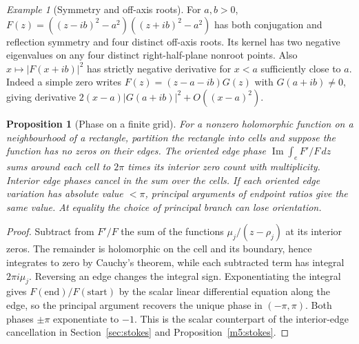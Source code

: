 \documentclass[11pt,reqno]{amsart}
\newtheorem{proposition}[theorem]{Proposition}
\theoremstyle{definition}
\theoremstyle{remark}
\newtheorem{example}[theorem]{Example}
\numberwithin{equation}{section}
\newcommand{\im}{\operatorname{Im}}
\begin{document}
\begin{example}[Symmetry and off-axis roots]\label{m6:quartet}
For \(a,b>0\), \(F(z)=((z-ib)^2-a^2)((z+ib)^2-a^2)\) has both
conjugation and reflection symmetry and four distinct off-axis
roots. Its kernel has two negative eigenvalues on any four
distinct right-half-plane nonroot points. Also \(x\mapsto
|F(x+ib)|^2\) has strictly negative derivative for \(x<a\)
sufficiently close to \(a\). Indeed a simple zero writes
\(F(z)=(z-a-ib)G(z)\) with \(G(a+ib)\ne0\), giving derivative
\(2(x-a)|G(a+ib)|^2+O((x-a)^2)\).
\end{example}

\begin{proposition}[Phase on a finite grid]\label{m6:phase}
For a nonzero holomorphic function on a neighbourhood of a
rectangle, partition the rectangle into cells and suppose the
function has no zeros on their edges. The oriented edge phase
\(\im\int_e F'/F\,dz\) sums around each cell to \(2\pi\) times
its interior zero count with multiplicity. Interior edge phases
cancel in the sum over the cells. If each oriented edge variation
has absolute value \(<\pi\), principal arguments of endpoint
ratios give the same value. At equality the choice of principal
branch can lose orientation.
\end{proposition}
\begin{proof}
Subtract from \(F'/F\) the sum of the functions
\(\mu_j/(z-\rho_j)\) at its interior zeros. The remainder is
holomorphic on the cell and its boundary, hence integrates to
zero by Cauchy's theorem, while each subtracted term has
integral \(2\pi i\mu_j\). Reversing an edge changes the integral
sign. Exponentiating the integral gives \(F(\mathrm{end})/
F(\mathrm{start})\) by the scalar linear differential equation
along the edge, so the principal argument recovers the unique
phase in \((-\pi,\pi)\). Both phases \(\pm\pi\) exponentiate to
\(-1\). This is the scalar counterpart of the interior-edge
cancellation in Section~\ref{sec:stokes} and Proposition~\ref{m5:stokes}.
\end{proof}
\end{document}
